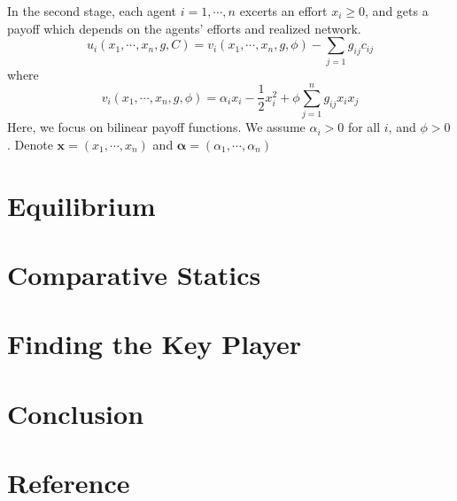 \documentclass[12pt]{article}
\theoremstyle{definition}
\begin{document}
In the second stage, each agent $i = 1, \cdots, n$ excerts an effort $x_i \ge 0$, and gets a payoff which depends on the agents' efforts and realized network.
\[ u_i(x_1, \cdots, x_n, g, C) = v_i(x_1, \cdots, x_n, g, \phi) - \sum_{j=1} g_{ij} c_{ij} \]
where
\[ v_i(x_1, \cdots, x_n, g, \phi) = \alpha_i x_i - \frac{1}{2} x_i^2 + \phi \sum_{j=1}^n g_{ij} x_i x_j \]
Here, we focus on bilinear payoff functions.
We assume $\alpha_i > 0$ for all $i$, and $\phi > 0$.
Denote $\boldsymbol{x} = (x_1, \cdots, x_n)$ and $\boldsymbol{\alpha} = (\alpha_1, \cdots, \alpha_n)$

\section{Equilibrium}


\section{Comparative Statics}


\section{Finding the Key Player}


\section{Conclusion}


\section{Reference}
\end{document}
